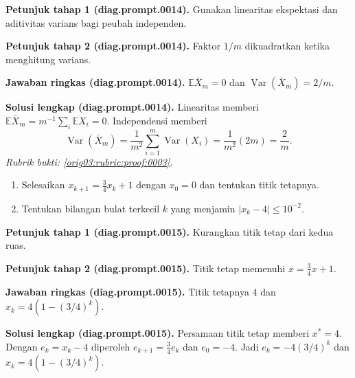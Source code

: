 \par\noindent\textbf{Petunjuk tahap 1 (diag.prompt.0014).}
Gunakan linearitas ekspektasi dan aditivitas varians bagi peubah independen.
\label{orig03:diag:hint1:0014}
\par\noindent\textbf{Petunjuk tahap 2 (diag.prompt.0014).}
Faktor $1/m$ dikuadratkan ketika menghitung varians.
\label{orig03:diag:hint2:0014}
\par\noindent\textbf{Jawaban ringkas (diag.prompt.0014).}
$\mathbb{E}\bar X_m=0$ dan $\operatorname{Var}(\bar X_m)=2/m$.
\label{orig03:diag:answer:0014}
\par\noindent\textbf{Solusi lengkap (diag.prompt.0014).}
Linearitas memberi
$\mathbb{E}\bar X_m=m^{-1}\sum_i\mathbb{E}X_i=0$. Independensi memberi
\[
\operatorname{Var}(\bar X_m)=\frac1{m^2}\sum_{i=1}^m
\operatorname{Var}(X_i)=\frac1{m^2}(2m)=\frac2m.
\]
\emph{Rubrik bukti: \ref{orig03:rubric:proof:0003}.}
\label{orig03:diag:solution:0014}

\begin{exercise}
\label{orig03:diag:problem:0008}
\begin{enumerate}
\item\label{orig03:diag:prompt:0015}
Selesaikan $x_{k+1}=\tfrac34x_k+1$ dengan $x_0=0$ dan tentukan titik
tetapnya.
\item\label{orig03:diag:prompt:0016}
Tentukan bilangan bulat terkecil $k$ yang menjamin $|x_k-4|\leq10^{-2}$.
\end{enumerate}
\end{exercise}

\par\noindent\textbf{Petunjuk tahap 1 (diag.prompt.0015).}
Kurangkan titik tetap dari kedua ruas.
\label{orig03:diag:hint1:0015}
\par\noindent\textbf{Petunjuk tahap 2 (diag.prompt.0015).}
Titik tetap memenuhi $x=\tfrac34x+1$.
\label{orig03:diag:hint2:0015}
\par\noindent\textbf{Jawaban ringkas (diag.prompt.0015).}
Titik tetapnya $4$ dan $x_k=4(1-(3/4)^k)$.
\label{orig03:diag:answer:0015}
\par\noindent\textbf{Solusi lengkap (diag.prompt.0015).}
Persamaan titik tetap memberi $x^*=4$. Dengan $e_k=x_k-4$ diperoleh
$e_{k+1}=\tfrac34e_k$ dan $e_0=-4$. Jadi
$e_k=-4(3/4)^k$ dan $x_k=4(1-(3/4)^k)$.
\label{orig03:diag:solution:0015}

